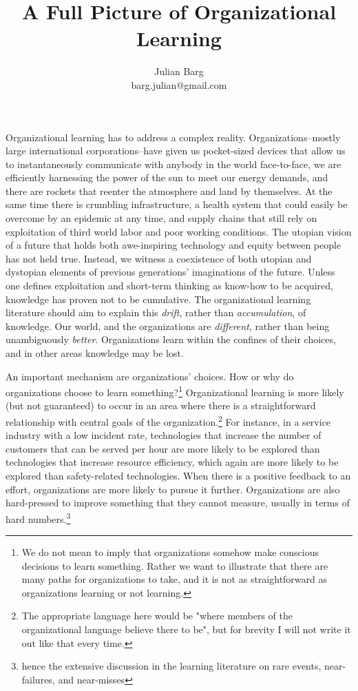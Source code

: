 \documentclass[12pt, man, natbib]{apa6}
\title{A Full Picture of Organizational Learning}
\author{Julian Barg\\barg.julian@gmail.com}
\affiliation{Ivey Business School}
\begin{document}
	
	\maketitle
	
	\singlespacing
	
	\section{}	
	Organizational learning has to address a complex reality. Organizations--mostly large international corporations--have given us pocket-sized devices that allow us to instantaneously communicate with anybody in the world face-to-face, we are efficiently harnessing the power of the sun to meet our energy demands, and there are rockets that reenter the atmosphere and land by themselves. At the same time there is crumbling infrastructure, a health system that could easily be overcome by an epidemic at any time, and supply chains that still rely on exploitation of third world labor and poor working conditions. The utopian vision of a future that holds both awe-inspiring technology and equity between people has not held true. Instead, we witness a coexistence of both utopian and dystopian elements of previous generations' imaginations of the future. Unless one defines exploitation and short-term thinking as know-how to be acquired, knowledge has proven not to be cumulative. The organizational learning literature should aim to explain this \textit{drift}, rather than \textit{accumulation}, of knowledge. Our world, and the organizations are \textit{different}, rather than being unambiguously \textit{better}. Organizations learn within the confines of their choices, and in other areas knowledge may be lost.
	
	An important mechanism are organizations' choices. How or why do organizations choose to learn something?\footnote{We do not mean to imply that organizations somehow make conscious decisions to learn something. Rather we want to illustrate that there are many paths for organizations to take, and it is not as straightforward as organizations learning or not learning.} Organizational learning is more likely (but not guaranteed) to occur in an area where there is a straightforward relationship with central goals of the organization.\footnote{The appropriate language here would be "where members of the organizational language believe there to be", but for brevity I will not write it out like that every time.} For instance, in a service industry with a low incident rate, technologies that increase the number of customers that can be served per hour are more likely to be explored than technologies that increase resource efficiency, which again are more likely to be explored than safety-related technologies. When there is a positive feedback to an effort, organizations are more likely to pursue it further. Organizations are also hard-pressed to improve something that they cannot measure, usually in terms of hard numbers.\footnote{hence the extensive discussion in the learning literature on rare events, near-failures, and near-misses}
	
\end{document}
